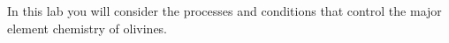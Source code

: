 In this lab you will consider the processes and conditions that control the major element chemistry of olivines.